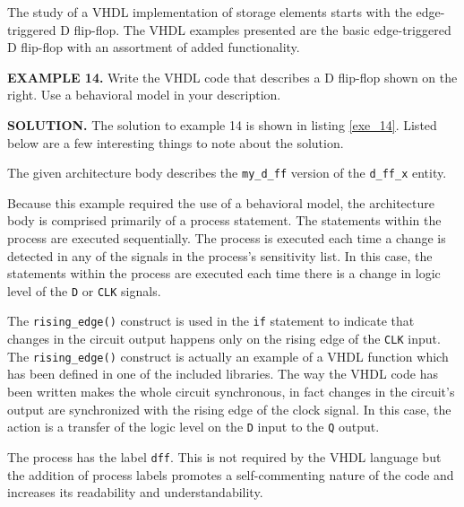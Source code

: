 The study of a VHDL implementation of storage elements starts with the edge-triggered D flip-flop. The VHDL examples presented are the basic edge-triggered D flip-flop with an assortment of added functionality. 
\begin{leftbar}
\begin{minipage}{0.5\linewidth}
\noindent
\textbf{EXAMPLE 14.}
Write the VHDL code that describes a D flip-flop shown on the right. Use a behavioral model in your description.
\end{minipage}
\begin{minipage}{0.47\linewidth}
\begin{flushright}
\end{flushright}
\end{minipage}
\end{leftbar}
\noindent
\textbf{SOLUTION.} The solution to example 14 is shown in listing \ref{exe_14}. Listed below are a few interesting things to note about the solution.
\begin{my_list}
\item The given architecture body describes the \texttt{my\_d\_ff} version of the \texttt{d\_ff\_x} entity.
\item Because this example required the use of a behavioral model, the architecture body is comprised primarily of a process statement. The statements within the process are executed sequentially. The process is executed each time a change is detected in any of the signals in the process's sensitivity list.  In this case, the statements within the process are executed each time there is a change in logic level of the \texttt{D} or \texttt{CLK} signals.
\item The \texttt{rising\_edge()} construct is used in the \texttt{if} statement to indicate that changes in the circuit output happens only on the rising edge of the \texttt{CLK} input. The \texttt{rising\_edge()} construct is actually an example of a VHDL function which has been defined in one of the included libraries. The way the VHDL code has been written makes the whole circuit synchronous, in fact changes in the circuit's output are synchronized with the rising edge of the clock signal. In this case, the action is a transfer of the logic level on the \texttt{D} input to the \texttt{Q} output. 
\item The process has the label \texttt{dff}. This is not required by the VHDL language but the addition of process labels promotes a self-commenting nature of the code and increases its readability and understandability. 
\end{my_list}
